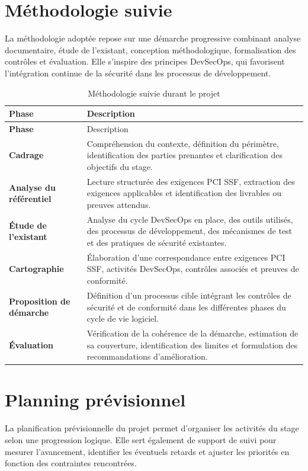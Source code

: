 \documentclass[12pt,a4paper]{report}
\begin{document}
\section{Méthodologie suivie}

La méthodologie adoptée repose sur une démarche progressive combinant analyse documentaire, étude de l'existant, conception méthodologique, formalisation des contrôles et évaluation. Elle s'inspire des principes DevSecOps, qui favorisent l'intégration continue de la sécurité dans les processus de développement.

\begin{longtable}{>{\bfseries}p{3.2cm}p{11cm}}
    \caption{Méthodologie suivie durant le projet}
    \label{tab:methode-projet} \\
    \toprule
    Phase & Description \\
    \midrule
    \endfirsthead
    \toprule
    Phase & Description \\
    \midrule
    \endhead
    Cadrage & Compréhension du contexte, définition du périmètre, identification des parties prenantes et clarification des objectifs du stage. \\
    Analyse du référentiel & Lecture structurée des exigences PCI SSF, extraction des exigences applicables et identification des livrables ou preuves attendus. \\
    Étude de l'existant & Analyse du cycle DevSecOps en place, des outils utilisés, des processus de développement, des mécanismes de test et des pratiques de sécurité existantes. \\
    Cartographie & Élaboration d'une correspondance entre exigences PCI SSF, activités DevSecOps, contrôles associés et preuves de conformité. \\
    Proposition de démarche & Définition d'un processus cible intégrant les contrôles de sécurité et de conformité dans les différentes phases du cycle de vie logiciel. \\
    Évaluation & Vérification de la cohérence de la démarche, estimation de sa couverture, identification des limites et formulation des recommandations d'amélioration. \\
    \bottomrule
\end{longtable}

\section{Planning prévisionnel}

La planification prévisionnelle du projet permet d'organiser les activités du stage selon une progression logique. Elle sert également de support de suivi pour mesurer l'avancement, identifier les éventuels retards et ajuster les priorités en fonction des contraintes rencontrées.
\end{document}
